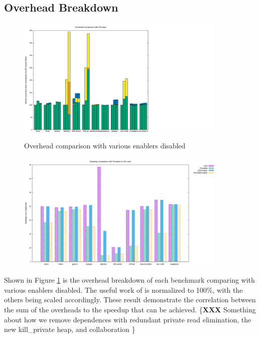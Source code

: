 \subsection{Overhead Breakdown}

\begin{figure}[htp]
  \includegraphics[width=0.9\textwidth]{figures/overheads}
  \label{fig:overheads}
  \caption{Overhead comparison with various enablers disabled}
\end{figure}
\begin{figure}[htp]
  \includegraphics[width=0.9\textwidth]{figures/comparison}
\end{figure}
Shown in Figure \ref{fig:overheads} is the overhead breakdown of each
benchmark comparing \name with various enablers disabled. The useful work
of \name is normalized to 100\%, with the others being scaled accordingly.
These result demonstrate the correlation between the sum of the overheads
to the speedup that can be achieved. \{\textbf{XXX} Something about
how we remove dependences with redundant private read elimination,
the new kill\_private heap, and collaboration \}

